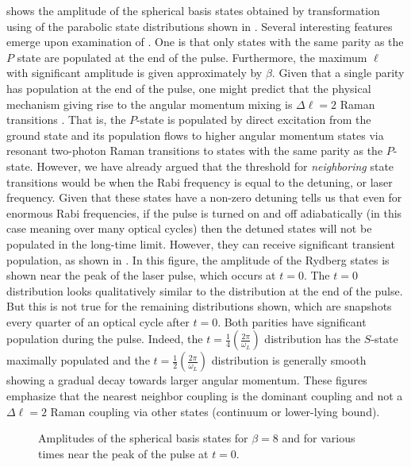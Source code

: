  shows the amplitude of the spherical basis states obtained by
transformation using  of the parabolic state distributions shown
in .  Several interesting features emerge upon examination of
.  One is that only states with the same parity as the $P$ state are
populated at the end of the pulse.  Furthermore, the maximum $\ell$ with
significant amplitude is given approximately by $\beta$.  Given that a single
parity has population at the end of the pulse, one might predict that the
physical mechanism giving rise to the angular momentum mixing is
$\Delta \ell = 2$ Raman transitions \cite{Grobe:86,Ivanov:94}.  That is, the
$P$-state is populated by direct excitation from the ground state and its
population flows to higher angular momentum states via resonant two-photon Raman
transitions to states with the same parity as the $P$-state.  However, we have
already argued that the threshold for {\it neighboring} state transitions would
be when the Rabi frequency is equal to the detuning, or laser frequency.  Given
that these states have a non-zero detuning tells us that even for enormous Rabi
frequencies, if the pulse is turned on and off adiabatically (in this case
meaning over many optical cycles) then the detuned states will not be
populated in the long-time limit.  However, they can receive significant
transient population, as shown in .  In this figure, the
amplitude of the Rydberg states is shown near the peak of the laser pulse,
which occurs at $t=0$.  The $t=0$ distribution looks qualitatively similar to
the distribution at the end of the pulse.  But this is not true for
the remaining distributions shown, which are snapshots every quarter of an
optical cycle after $t=0$.  Both parities have significant population during the
pulse. Indeed, the $t = \frac{1}{4}\left(\frac{2\pi}{\omega_L}\right)$
distribution has the $S$-state maximally populated and the $t =
\frac{1}{2}\left(\frac{2\pi}{\omega_L}\right)$ distribution is
generally smooth showing a gradual decay towards larger angular momentum. 
These figures emphasize that the nearest neighbor coupling is the dominant
coupling and not a $\Delta\ell = 2$ Raman coupling via other states (continuum
or lower-lying bound).

  
\begin{figure}[tbp]
\bigskip
{} {Amplitudes of
the spherical basis states for $\beta = 8$ and for various times near the peak
of the pulse at $t=0$.
\label{ampl_t}}
\end{figure}


